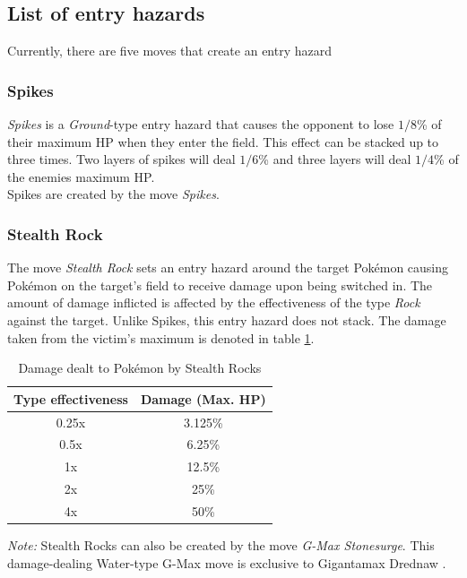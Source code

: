 \subsection{List of entry hazards}
Currently, there are five moves that create an entry hazard

\subsubsection{Spikes}
\textit{Spikes} is a \textit{Ground}-type entry hazard that causes the opponent
to lose $1/8$\% of their maximum \ac{HP} when they enter the field. This
effect can be stacked up to three times. Two layers of spikes will deal
$1/6$\% and three layers will deal $1/4$\% of the enemies maximum \ac{HP}. \\
Spikes are created by the move \textit{Spikes}\cite{Bulbapedia:Spikes}.

\subsubsection{Stealth Rock}
\label{sec:stealthrock}
The move \textit{Stealth Rock} sets an entry hazard around the target Pokémon
causing Pokémon on the target's field to receive damage upon being switched in.
The amount of damage inflicted is affected by the effectiveness of the type
\textit{Rock} against the target. Unlike Spikes, this entry hazard does not stack.
The damage taken from the victim's maximum is denoted in table 
\ref{tab:stealth-rock-damage}\cite{Bulbapedia:StealthRock}.
\begin{table}[h]
	\label{tab:stealth-rock-damage}
	\centering
	\begin{tabular}{|c|c|}
		\hline
		\textbf{Type effectiveness} & \textbf{Damage (Max. \ac{HP}}) \\
		\hline 
		0.25x & 3.125\% \\ 
		\hline 
		0.5x &  6.25\% \\ 
		\hline 
		1x & 12.5\% \\
		\hline
		2x & 25\% \\
		\hline
		4x & 50\% \\
		\hline
	\end{tabular} 
	\caption{Damage dealt to Pokémon by Stealth Rocks\cite{Bulbapedia:StealthRock}}
\end{table}
\textit{Note:} Stealth Rocks can also be created by the move \textit{G-Max Stonesurge}.
This damage-dealing Water-type G-Max move is exclusive to Gigantamax Drednaw
\cite{Bulbapedia:GMaxStonesurge}. \\

